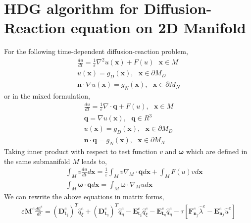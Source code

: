 \documentclass{elsart}
\begin{document}
\section{HDG algorithm for Diffusion-Reaction equation on 2D Manifold}
For the following time-dependent diffusion-reaction problem,
\begin{eqnarray*}
\frac{du}{dt} = \frac{1}{\varepsilon} \nabla^2 u (\mathbf{x}) + F(u) ~~~ \mathbf{x} \in \mathit{M} \\
u(\mathbf{x}) = g_D (\mathbf{x}), ~~~ \mathbf{x} \in \partial \mathit{M}_D \nonumber \\
 \mathbf{n} \cdot \nabla u(\mathbf{x}) = g_N (\mathbf{x}), ~~~ \mathbf{x} \in \partial \mathit{M}_N \nonumber
\end{eqnarray*}
or in the mixed formulation,
\begin{eqnarray*}
\frac{du}{dt}  = \frac{1}{\varepsilon}  \nabla \cdot \mathbf{q} + F(u), ~~~ \mathbf{x} \in \mathit{M} \\
\mathbf{q} = \nabla u(\mathbf{x}),  ~~~ \mathbf{q} \in \mathit{R^3} \\
u(\mathbf{x}) = g_D (\mathbf{x}), ~~~ \mathbf{x} \in \partial \mathit{M}_D \\
\mathbf{n} \cdot \mathbf{q}= g_N (\mathbf{x}), ~~~ \mathbf{x} \in \partial \mathit{M}_N
\end{eqnarray*}
Taking inner product with respect to test function $v$ and $\boldsymbol{\omega}$ which are defined in the same submanifold $\mathit{M}$ leads to,
\begin{eqnarray*}
 & &\int_{\mathit{M}} v \frac{du}{dt} d \mathbf{x} = \frac{1}{\varepsilon} \int_{\mathit{M}} v  \nabla_{\mathit{M}} \cdot \mathbf{q} d \mathbf{x} + \int_{\mathit{M}} F(u) v d \mathbf{x} \label{eqn1} \\
 & &\int_{\mathit{M}} \boldsymbol{\omega}  \cdot \mathbf{q} d \mathbf{x} = \int_{\mathit{M}} \boldsymbol{\omega} \cdot  \nabla_{\mathit{M}} u d \mathbf{x} \label{eqn2} 
\end{eqnarray*}
We can rewrite the above equations in matrix forms,
\begin{eqnarray*}
\varepsilon \mathbf{M}^e  \frac{d \hat{u}^e}{dt} = \left (\mathbf{D}^e_{\mathbf{t}_{\xi}} \right )^T \hat{q}_{\xi}^e + \left ( \mathbf{D}^e_{\mathbf{t}_{\eta}} \right )^T \hat{q}_{\eta}^e - \mathbf{E}^e_{\mathbf{t}_{\xi}} \hat{q}_{\xi}^e  - \mathbf{E}^e_{\mathbf{t}_{\eta}} \hat{q}_{\eta}^e - \tau \left [ \mathbf{F}^e_{\mathbf{n}_f} \hat{\lambda}^e - \mathbf{E}^e_{\mathbf{n}_f} \hat{u}^e  \right ] 
\end{eqnarray*}
\end{document}
